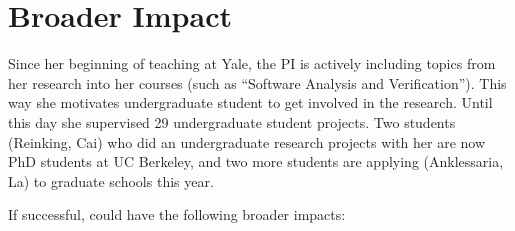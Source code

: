 
\section{Broader Impact}

Since her beginning of teaching at Yale, the PI is actively including topics from her 
research into her courses (such as ``Software Analysis and Verification''). This way
she motivates undergraduate student to get involved in the research. Until this day 
she supervised 29 undergraduate student projects. Two students (Reinking, Cai) 
who did an undergraduate research projects with her are now PhD students at 
UC Berkeley, and two more students are applying (Anklessaria, La) to graduate schools 
this year.



If successful, \app could have the following broader impacts:

